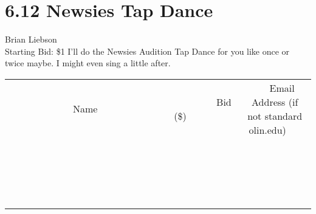 \documentclass[11pt]{article}
\begin{document}
\section*{6.12 Newsies Tap Dance}
Brian Liebson
\\
Starting Bid: \$1
\newline
I'll do the Newsies Audition Tap Dance for you like once or twice maybe. I might even sing a little after.
\\[3ex]
\begin{tabular}{c c c}
~~~~~~~~~~~~~Name~~~~~~~~~~~~~ & ~~~~~~~~~Bid (\$)~~~~~~~~~  & ~~~Email Address (if not standard olin.edu)~~~\\
 & & \\
\hline
 & & \\
\hline
 & & \\
\hline
 & & \\
\hline
 & & \\
\hline
 & & \\
\hline
 & & \\
\hline
 & & \\
\hline
 & & \\
\hline
 & & \\
\hline
 & & \\
\hline
 & & \\
\hline
 & & \\
\hline
 & & \\
\hline
 & & \\
\hline
 & & \\
\hline
 & & \\
\hline
 & & \\
\hline
 & & \\
\hline
\end{tabular}
\newpage
\end{document}
